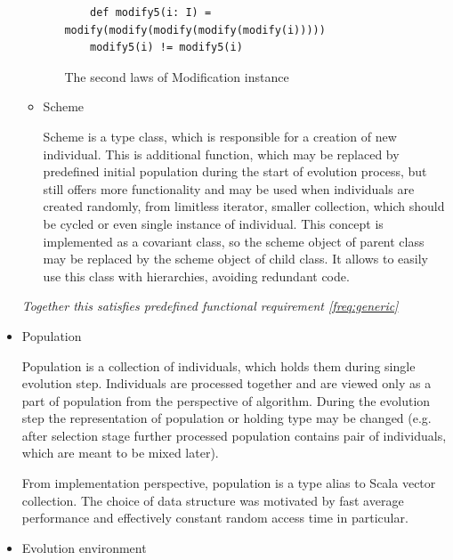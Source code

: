 \begin{itemize}
\begin{itemize}
\begin{enumerate}
\begin{listing}
\begin{verbatim}
	def modify5(i: I) = modify(modify(modify(modify(modify(i)))))
	modify5(i) != modify5(i)
\end{verbatim}
\caption{The second laws of Modification instance} \label{listing:mod2}
\end{listing}


\end{enumerate}
\medbreak

\item
Scheme

Scheme is a type class, which is responsible for a creation of new individual. This is additional function, which may be replaced by predefined initial population during the start of evolution process, but still offers more functionality and may be used when individuals are created randomly, from limitless iterator, smaller collection, which should be cycled or even single instance of individual. This concept is implemented as a covariant class, so the scheme object of parent class may be replaced by the scheme object of child class. It allows to easily use this class with hierarchies, avoiding redundant code. 
\end{itemize} 

\smallskip \textit{Together this satisfies predefined functional requirement \ref{freq:generic}}

\medbreak

\item
Population

Population is a collection of individuals, which holds them during single evolution step. Individuals are processed together and are viewed only as a part of population from the perspective of algorithm. During the evolution step the representation of population or holding type may be changed (e.g. after selection stage further processed population contains pair of individuals, which are meant to be mixed later).

From implementation perspective, population is a type alias to Scala vector collection. The choice of data structure was motivated by fast average performance and effectively constant random access time in particular.
\medbreak

\item
Evolution environment


\end{itemize}
